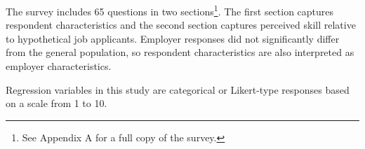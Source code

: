 \documentclass[review]{elsarticle}
\begin{document}
The survey includes 65 questions in two sections\footnote{See Appendix A for a full copy of the survey.}.
The first section captures respondent characteristics and the second section captures perceived skill relative to hypothetical job applicants.
Employer responses did not significantly differ from the general population,
so respondent characteristics are also interpreted as employer characteristics.

Regression variables in this study are categorical or Likert-type responses based on a scale from 1 to 10.
%
\end{document}
